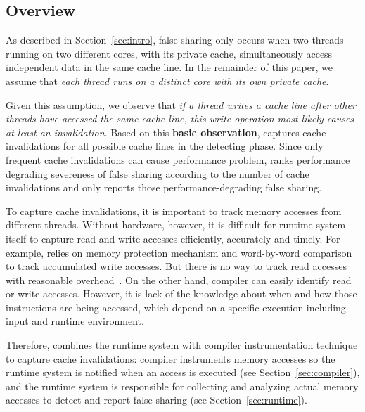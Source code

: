 \label{sec:detection}

\subsection{Overview}
\label{sec:overview}
As described in Section~\ref{sec:intro}, 
false sharing only occurs when two threads running on two different cores, with its private cache,
simultaneously access independent data in the same cache line.
In the remainder of this paper, we assume that {\it each thread runs on a 
distinct core with its own private cache}. 

Given this assumption, we observe that 
{\it if a thread writes a cache line after other threads have 
accessed the same cache line, this write operation most likely causes at least
an invalidation}. 
Based on this \textbf{basic observation}, \Defaults{} captures cache invalidations for all possible 
cache lines 
in the detecting phase. Since only frequent cache invalidations can cause performance problem, 
 ranks performance degrading severeness of false sharing according to 
the number of cache invalidations and only reports those performance-degrading false sharing.
 
To capture cache invalidations, it is important to track memory accesses from different 
threads. 
Without hardware, however, it is difficult for runtime system itself to 
capture read and write accesses efficiently, accurately and timely. 
For example, \Sheriff{} relies on memory protection mechanism and word-by-word
comparison to track accumulated write accesses. But there is no way to track read accesses with  
reasonable overhead~\cite{sheriff}. 
On the other hand, compiler can easily identify  
read or write accesses. However,
it is lack of the knowledge about when and how those instructions are being accessed, 
which depend on a specific execution including input and runtime environment. 

Therefore,  combines the runtime system with compiler instrumentation technique to capture 
cache invalidations: compiler instruments memory accesses so the runtime
system is notified when an access is executed (see Section~\ref{sec:compiler}),
and the runtime system is responsible for collecting and analyzing actual memory accesses 
to detect and report false sharing (see Section~\ref{sec:runtime}).

